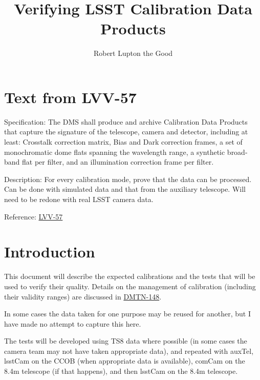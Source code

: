 \documentclass[DM,authoryear,toc,lsstdraft]{lsstdoc}
\title{Verifying LSST Calibration Data Products}
\author{%
Robert Lupton the Good
}
\date{\vcsDate}
\begin{document}

\maketitle

\renewcommand{\secRef}[1]{Sec. \ref{#1}}
\section{Text from LVV-57}
Specification: The DMS shall produce and archive Calibration Data Products that capture the signature of the
telescope, camera and detector, including at least: Crosstalk correction matrix, Bias and Dark correction
frames, a set of monochromatic dome flats spanning the wavelength range, a synthetic broad-band flat per
filter, and an illumination correction frame per filter.

Description: For every calibration mode, prove that the data can be processed. Can be done with simulated data and that
from the auxiliary telescope. Will need to be redone with real LSST camera data.

Reference: \href{https://jira.lsstcorp.org/browse/LVV-57}{LVV-57}

\section{Introduction}

This document will describe the expected calibrations and the tests that will be used to verify their quality.  Details on the management of calibration (including their validity ranges) are discussed in \href{https://dmtn-148.lsst.io}{DMTN-148}.

In some cases the data taken for one purpose may be reused for another, but I have made no attempt to
capture this here.

The tests will be developed using TS8 data where possible (in some cases the camera team may not have taken
appropriate data), and repeated with auxTel, lsstCam on the CCOB (when appropriate data is available), comCam
on the 8.4m telescope (if that happens), and then lsstCam on the 8.4m telescope.
\end{document}
